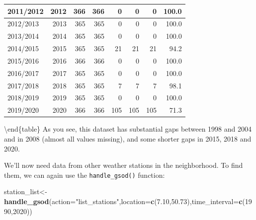 \documentclass[
]{book}
\newenvironment{Shaded}{\begin{snugshade}}{\end{snugshade}}
\newcommand{\DataTypeTok}[1]{\textcolor[rgb]{0.13,0.29,0.53}{#1}}
\newcommand{\DecValTok}[1]{\textcolor[rgb]{0.00,0.00,0.81}{#1}}
\newcommand{\FloatTok}[1]{\textcolor[rgb]{0.00,0.00,0.81}{#1}}
\newcommand{\KeywordTok}[1]{\textcolor[rgb]{0.13,0.29,0.53}{\textbf{#1}}}
\newcommand{\NormalTok}[1]{#1}
\newcommand{\OperatorTok}[1]{\textcolor[rgb]{0.81,0.36,0.00}{\textbf{#1}}}
\newcommand{\StringTok}[1]{\textcolor[rgb]{0.31,0.60,0.02}{#1}}
\begin{document}
\begin{tabular}[t]{l|r|r|r|r|r|r|r}
\hline
2011/2012 & 2012 & 366 & 366 & 0 & 0 & 0 & 100.0\\
\hline
2012/2013 & 2013 & 365 & 365 & 0 & 0 & 0 & 100.0\\
\hline
2013/2014 & 2014 & 365 & 365 & 0 & 0 & 0 & 100.0\\
\hline
2014/2015 & 2015 & 365 & 365 & 21 & 21 & 21 & 94.2\\
\hline
2015/2016 & 2016 & 366 & 366 & 0 & 0 & 0 & 100.0\\
\hline
2016/2017 & 2017 & 365 & 365 & 0 & 0 & 0 & 100.0\\
\hline
2017/2018 & 2018 & 365 & 365 & 7 & 7 & 7 & 98.1\\
\hline
2018/2019 & 2019 & 365 & 365 & 0 & 0 & 0 & 100.0\\
\hline
2019/2020 & 2020 & 366 & 366 & 105 & 105 & 105 & 71.3\\
\hline
\end{tabular}

\textbackslash end\{table\}
As you see, this dataset has substantial gaps between 1998 and 2004 and in 2008 (almost all values missing), and some shorter gaps in 2015, 2018 and 2020.

We'll now need data from other weather stations in the neighborhood. To find them, we can again use the \texttt{handle\_gsod()} function:

\begin{Shaded}
\begin{Highlighting}[]
\NormalTok{station_list<-}\KeywordTok{handle_gsod}\NormalTok{(}\DataTypeTok{action=}\StringTok{"list_stations"}\NormalTok{,}\DataTypeTok{location=}\KeywordTok{c}\NormalTok{(}\FloatTok{7.10}\NormalTok{,}\FloatTok{50.73}\NormalTok{),}\DataTypeTok{time_interval=}\KeywordTok{c}\NormalTok{(}\DecValTok{1990}\NormalTok{,}\DecValTok{2020}\NormalTok{))}
\end{Highlighting}
\end{Shaded}

\begin{Shaded}
\end{Shaded}
\end{document}
